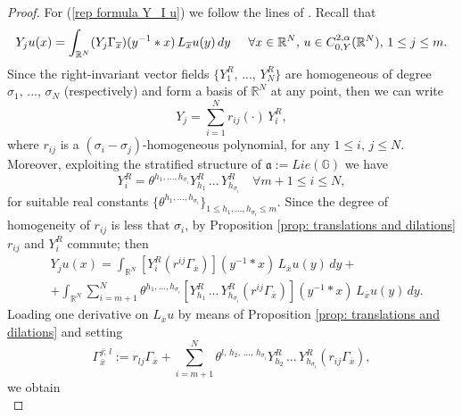 \documentclass{article}
\numberwithin{equation}{section}
\begin{document}
\begin{proof}
    For (\ref{rep formula Y_I u}) we follow the lines of \cite[Proposition 8.32]{librone}. Recall that
    \begin{equation*}
    Y_j u(x)=\int_{\mathbb{R}^N} (Y_j \Gamma_{\overline{x}})(y^{-1} * x) \, L_{\overline{x}}u(y) \, dy \hspace{5mm} \forall x \in \mathbb{R}^N, \, u \in C^{2,\alpha}_{0,Y}(\mathbb{R}^N), \, 1 \leq j \leq m.
\end{equation*}
    Since the right-invariant vector fields $\{Y_1^R, \, ..., \, Y_N^R\}$ are homogeneous of degree $\sigma_1, \, ..., \, \sigma_N$ (respectively) and form a basis of $\mathbb{R}^N$ at any point, then we can write
    \begin{equation*}
        Y_j = \sum_{i=1}^N r_{ij}(\cdot) \, Y_i^R,
    \end{equation*}
    where $r_{ij}$ is a $(\sigma_i-\sigma_j)$-homogeneous polynomial, for any $1 \leq i, \, j \leq N$. Moreover, exploiting the stratified structure of $\mathfrak{a}:=Lie(\mathbb{G})$ we have
    \begin{equation*}
        Y_i^R = \theta^{h_1,...,h_{\sigma_i}} Y_{h_1}^R \, ... \, Y_{h_{\sigma_i}}^R \quad \forall m+1 \leq i \leq N,
    \end{equation*}
    for suitable real constants $\{\theta^{h_1,...,h_{\sigma_i}}\}_{1 \leq h_1,...,h_{\sigma_i} \leq m}$. Since the degree of homogeneity of $r_{ij}$ is less that $\sigma_i$, by Proposition \ref{prop: translations and dilations} $r_{ij}$ and $Y_i^R$ commute; then
    \begin{align*}
        & Y_j u(x) = \int_{\mathbb{R}^N} \left[Y_i^R(r^{ij} \Gamma_{\overline{x}})\right](y^{-1} * x) \, L_{\overline{x}} u(y) \, dy + \\
        & + \int_{\mathbb{R}^N} \sum_{i=m+1}^N \theta^{h_1,...,h_{\sigma_i}} \left[ Y_{h_1}^R \, ... \, Y_{h_{\sigma_i}}^R(r^{ij} \Gamma_{\overline{x}}) \right](y^{-1} * x) \, L_{\overline{x}} u(y) \, dy.
    \end{align*}
    Loading one derivative on $L_{\overline{x}} u$ by means of Proposition \ref{prop: translations and dilations} and setting
    \begin{equation*}
        \Gamma_{\overline{x}}^{j; \, l}:=r_{lj} \Gamma_{\overline{x}} + \sum_{i=m+1}^N \theta^{l, \, h_2, \, ..., \, h_{\sigma_i}} Y_{h_2}^R \, ... \, Y_{h_{\sigma_i}}^R(r_{ij} \Gamma_{\overline{x}}),
    \end{equation*}
    we obtain
    \begin{equation}

\end{equation}
\end{proof}
\end{document}
